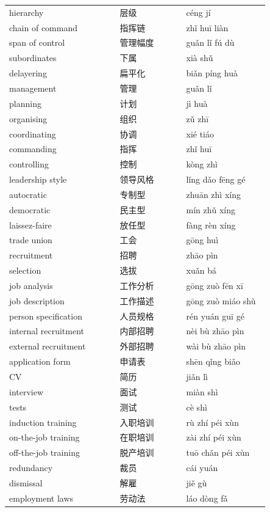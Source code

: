 \documentclass[11pt]{article}
\begin{document}
\begin{longtable}{@{}p{0.40\linewidth}p{0.24\linewidth}p{0.30\linewidth}@{}}
hierarchy & 层级 & céng jí \\
chain of command & 指挥链 & zhǐ huī liàn \\
span of control & 管理幅度 & guǎn lǐ fú dù \\
subordinates & 下属 & xià shǔ \\
delayering & 扁平化 & biǎn píng huà \\
management & 管理 & guǎn lǐ \\
planning & 计划 & jì huà \\
organising & 组织 & zǔ zhī \\
coordinating & 协调 & xié tiáo \\
commanding & 指挥 & zhǐ huī \\
controlling & 控制 & kòng zhì \\
leadership style & 领导风格 & lǐng dǎo fēng gé \\
autocratic & 专制型 & zhuān zhì xíng \\
democratic & 民主型 & mín zhǔ xíng \\
laissez-faire & 放任型 & fàng rèn xíng \\
trade union & 工会 & gōng huì \\
recruitment & 招聘 & zhāo pìn \\
selection & 选拔 & xuǎn bá \\
job analysis & 工作分析 & gōng zuò fēn xī \\
job description & 工作描述 & gōng zuò miáo shù \\
person specification & 人员规格 & rén yuán guī gé \\
internal recruitment & 内部招聘 & nèi bù zhāo pìn \\
external recruitment & 外部招聘 & wài bù zhāo pìn \\
application form & 申请表 & shēn qǐng biǎo \\
CV & 简历 & jiǎn lì \\
interview & 面试 & miàn shì \\
tests & 测试 & cè shì \\
induction training & 入职培训 & rù zhí péi xùn \\
on-the-job training & 在职培训 & zài zhí péi xùn \\
off-the-job training & 脱产培训 & tuō chǎn péi xùn \\
redundancy & 裁员 & cái yuán \\
dismissal & 解雇 & jiě gù \\
employment laws & 劳动法 & láo dòng fǎ \\

\end{longtable}
\end{document}
